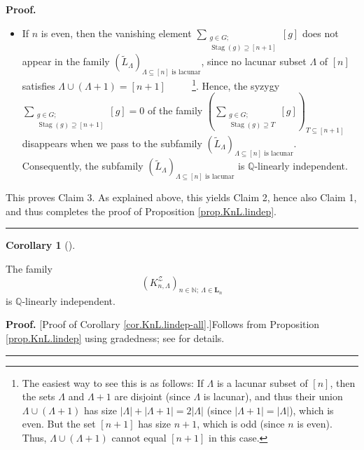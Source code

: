 \documentclass[numbers=enddot,12pt,final,onecolumn,notitlepage]{scrartcl}%
\theoremstyle{definition}
\newtheorem{coro}[theo]{Corollary}
\newenvironment{corollary}[1][]
{\begin{coro}[#1]\begin{leftbar}}
{\end{leftbar}\end{coro}}
\newenvironment{proof}[1][Proof]{\noindent\textbf{#1.} }{\ \rule{0.5em}{0.5em}}
\newenvironment{verlong}{}{}
\newenvironment{vershort}{}{}
\newcommand{\NN}{\mathbb{N}}
\let\sumnonlimits\sum
\renewcommand{\sum}{\sumnonlimits\limits}
\begin{document}
\begin{verlong}
\begin{proof}
\begin{itemize}
\item If $n$ is even, then the vanishing element $\sum_{\substack{g\in
G;\\\operatorname*{Stag}\left(  g\right)  \supseteq\left[  n+1\right]
}}\left[  g\right]  $ does not appear in the family $\left(  \widetilde{L}%
_{\Lambda}\right)  _{\Lambda\subseteq\left[  n\right]  \text{ is lacunar}}$,
since no lacunar subset $\Lambda$ of $\left[  n\right]  $ satisfies
$\Lambda\cup\left(  \Lambda+1\right)  =\left[  n+1\right]  $ \ \ \ \ %
\footnote{The easiest way to see this is as follows: If $\Lambda$ is a
lacunar subset of $\left[n\right]$, then the sets $\Lambda$ and
$\Lambda+1$ are disjoint (since $\Lambda$ is lacunar), and thus their
union $\Lambda\cup\left(  \Lambda+1\right)$ has size
$\left|\Lambda\right| + \left|\Lambda+1\right| =
2 \left|\Lambda\right|$ (since $\left|\Lambda+1\right| =
\left|\Lambda\right|$), which is even. But the set $\left[n+1\right]$
has size $n+1$, which is odd (since $n$ is even). Thus,
$\Lambda\cup\left(  \Lambda+1\right)$ cannot equal $\left[n+1\right]$
in this case.}. Hence, the
syzygy $\sum_{\substack{g\in G;\\\operatorname*{Stag}\left(  g\right)
\supseteq\left[  n+1\right]  }}\left[  g\right]  =0$ of the family $\left(
\sum_{\substack{g\in G;\\\operatorname*{Stag}\left(  g\right)  \supseteq
T}}\left[  g\right]  \right)  _{T\subseteq\left[  n+1\right]  }$ disappears
when we pass to the subfamily $\left(  \widetilde{L}_{\Lambda}\right)
_{\Lambda\subseteq\left[  n\right]  \text{ is lacunar}}$. Consequently, the
subfamily $\left(  \widetilde{L}_{\Lambda}\right)  _{\Lambda\subseteq\left[
n\right]  \text{ is lacunar}}$ is $\mathbb{Q}$-linearly independent.
\end{itemize}

This proves Claim 3. As explained above, this yields Claim 2, hence also Claim
1, and thus completes the proof of Proposition \ref{prop.KnL.lindep}.
\end{proof}
\end{verlong}

\begin{corollary}
\label{cor.KnL.lindep-all}The family%
\[
\left(  K_{n,\Lambda}^{\mathcal{Z}}\right) %
_{n \in \NN; \ \Lambda \in \mathbf{L}_n}
\]
is $\mathbb{Q}$-linearly independent.
\end{corollary}

\begin{vershort}
\begin{proof}
[Proof of Corollary \ref{cor.KnL.lindep-all}.]Follows from Proposition
\ref{prop.KnL.lindep} using gradedness; see \cite{verlong} for details.
\end{proof}
\end{vershort}
\end{document}
